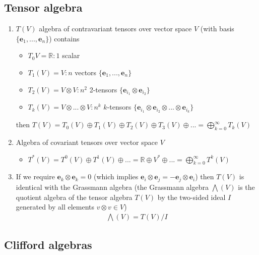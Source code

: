 \documentclass[../main.tex]{subfiles}
\begin{document}
\begin{itemize}
\subsection{Tensor algebra}
\begin{enumerate}
\item $T(V)$ algebra of contravariant tensors over vector space $V$ (with basis $\{\mathbf{e}_1,...,\mathbf{e}_n\}$) contains
\begin{itemize}
\item $T_0{V}=\mathbb{R}:1$ scalar
\item $T_1(V)=V: n$ vectors $\{\mathbf{e}_1,...,\mathbf{e}_n\}$
\item $T_2(V)=V\otimes V: n^2$ 2-tensors $\{\mathbf{e}_{i_1}\otimes\mathbf{e}_{i_2}\}$
\item $T_k(V)=V\otimes...\otimes V: n^k$ $k$-tensors $\{\mathbf{e}_{i_1}\otimes\mathbf{e}_{i_2}\otimes...\otimes\mathbf{e}_{i_k}\}$
\end{itemize}
then $T(V)=T_0(V)\oplus T_1(V)\oplus T_2(V)\oplus T_3(V)\oplus...=\bigoplus_{k=0}^\infty T_k(V)$
\item Algebra of covariant tensors over vector space $V$ 
\begin{itemize}
\item $T^*(V)=T^0(V)\oplus T^1(V)\oplus ...=\mathbb{R}\oplus V^*\oplus...=\bigoplus_{k=0}^\infty T^k(V)$
 \end{itemize}
\item If we require $\mathbf{e}_k\otimes\mathbf{e}_k=0$ (which implies $\mathbf{e}_i\otimes\mathbf{e}_j=-\mathbf{e}_j\otimes\mathbf{e}_i$) then $T(V)$ is identical with the Grassmann algebra (the Grassmann algebra $\bigwedge(V)$ is the  quotient algebra of the tensor algebra $T(V)$ by the two-sided ideal $I$ generated by all elements $v\otimes v\in V$)
\begin{align}
\bigwedge(V)=T(V)/I
\end{align}
\end{enumerate}

\subsection{Clifford algebras}


\end{itemize}
\end{document}
